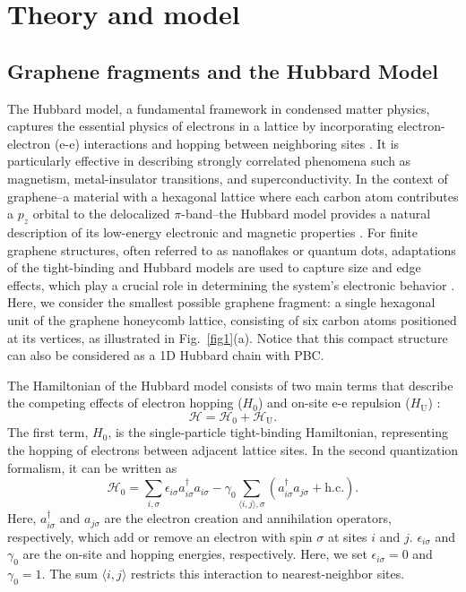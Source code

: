 \documentclass[twocolumn,superscriptaddress,amsmath,amssymb,showpacs,floatfix,preprintnumbers]{revtex4-1}
\newcommand{\s}{\sigma}
\newcommand{\mc}{\mathcal}
\newcommand{\mr}{\mathrm}
\begin{document}
\section{Theory and model} \label{s_the_mod}
\subsection{Graphene fragments and the Hubbard Model} \label{ss_grap_hub}

The Hubbard model, a fundamental framework in condensed matter physics, captures the essential
physics of electrons in a lattice by incorporating electron-electron (e-e) interactions and hopping
between neighboring sites \cite{Essler2005,LeBlanc2015,Qin2022}. 
%
It is particularly effective in describing strongly correlated phenomena such as magnetism,
metal-insulator transitions, and superconductivity. 
%
In the context of graphene--a material with a hexagonal lattice where each carbon atom contributes
a $p_z$ orbital to the delocalized $\pi$-band--the Hubbard model provides a natural description 
of its low-energy electronic and magnetic properties \cite{Geim2007,Castro2009}. 
%
For finite graphene structures, often referred to as nanoflakes or quantum dots, adaptations of 
the tight-binding and Hubbard models are used to capture size and edge effects, which play a
crucial role in determining the system's electronic behavior
\cite{Rozhkov2011,Oteyza2022,Fernandez2007,Guclu2014,Yazyev2010}.
%
Here, we consider the smallest possible graphene fragment: a single hexagonal unit of the graphene 
honeycomb lattice, consisting of six carbon atoms positioned at its vertices, as illustrated in
Fig.~\ref{fig1}(a).
%
Notice that this compact structure can also be considered as a 1D Hubbard chain with PBC.

The Hamiltonian of the Hubbard model consists of two main terms that describe the competing 
effects of electron hopping ($H_0$) and on-site e-e repulsion ($H_\mr{U}$) \cite{Hubbard1963}:
%
\begin{equation}  \label{eq:Htot}
	\mc H = \mc{H}_0 + \mc{H}_\mr{U}.
\end{equation}
%
The first term, $H_0$, is the single-particle tight-binding Hamiltonian, representing 
the hopping of electrons between adjacent lattice sites. 
%
In the second quantization formalism, it can be written as
%
\begin{equation}  \label{eq:h0}
	\mc{H}_0 = \sum_{i,\s} \epsilon_{i \s} a^\dagger_{i \s} a_{i \s}
	-\gamma_0 \sum_{\langle i,j \rangle, \s} \left(a^\dagger_{i \s} a_{j \s} 
	+ \text{h.c.}\right).
\end{equation}
%
Here, $a^\dagger_{i \s}$ and $a_{j \s}$ are the electron creation and annihilation operators, 
respectively, which add or remove an electron with spin $\s$ at sites $i$ and $j$. 
%
$\epsilon_{i \s}$ and $\gamma_0$ are the on-site and hopping energies, respectively. 
%
Here, we set $\epsilon_{i \s} = 0$ and $\gamma_0 = 1$.
%
The sum $\langle i,j \rangle$ restricts this interaction to nearest-neighbor sites.
\end{document}
